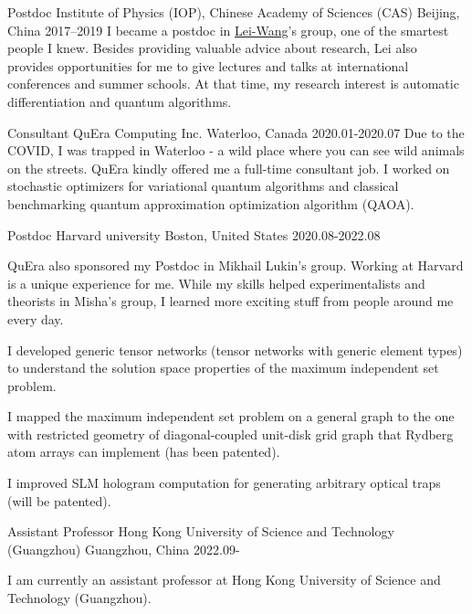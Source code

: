 \documentclass[11pt, a4paper]{awesome-cv}
\begin{document}
\begin{cvskills}
\end{cvskills}
\begin{cventries}
  \cventry
    {Postdoc}
    {Institute of Physics (IOP), Chinese Academy of Sciences (CAS)}
    {Beijing, China}
    {2017--2019}
    {
      I became a postdoc in \href{http://wangleiphy.github.io/}{Lei-Wang}'s group, one of the smartest people I knew. Besides providing valuable advice about research, Lei also provides opportunities for me to give lectures and talks at international conferences and summer schools. At that time, my research interest is automatic differentiation and quantum algorithms.
    }

  \cventry
    {Consultant}
    {QuEra Computing Inc.}
    {Waterloo, Canada}
    {2020.01-2020.07}  %
    {
        Due to the COVID, I was trapped in Waterloo - a wild place where you can see wild animals on the streets. QuEra kindly offered me a full-time consultant job. I worked on stochastic optimizers for variational quantum algorithms and classical benchmarking quantum approximation optimization algorithm (QAOA).    }

  \cventry
    {Postdoc}
    {Harvard university}
    {Boston, United States}
    {2020.08-2022.08}  %
    {
    QuEra also sponsored my Postdoc in Mikhail Lukin's group.
    Working at Harvard is a unique experience for me. While my skills helped experimentalists and theorists in Misha's group, I learned more exciting stuff from people around me every day.
    \vspace{2em}
\begin{cvitems}
\item I developed generic tensor networks (tensor networks with generic element types) to understand the solution space properties of the maximum independent set problem.
\item I mapped the maximum independent set problem on a general graph to the one with restricted geometry of diagonal-coupled unit-disk grid graph that Rydberg atom arrays can implement (has been patented).
\item I improved SLM hologram computation for generating arbitrary optical traps (will be patented).
    \end{cvitems}}
  \cventry
    {Assistant Professor}
    {Hong Kong University of Science and Technology (Guangzhou)}
    {Guangzhou, China}
    {2022.09-}  %
    {
\begin{cvitems}
    I am currently an assistant professor at Hong Kong University of Science and Technology (Guangzhou).
    \end{cvitems}}

\end{cventries}
\end{document}
